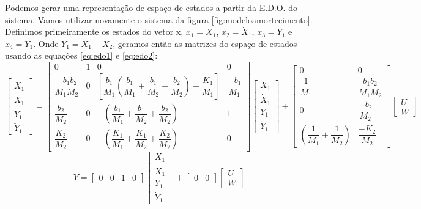 Podemos gerar uma representação de espaço de estados a partir da E.D.O. do sistema. Vamos utilizar novamente o sistema da figura \ref{fig:modeloamortecimento}. Definimos primeiramente os estados do vetor x, $x_1=X_1$, $x_2=\dot{X}_1$, $x_3=Y_1$ e $x_4=\dot{Y}_1$. Onde $Y_1=X_1-X_2$, geramos então as matrizes do espaço de estados usando as equações \eqref{eq:edo1} e \eqref{eq:edo2}:
\begin{equation}
\begin{bmatrix}
\dot{X}_1\\
\ddot{X}_1\\
\dot{Y}_1\\
\ddot{Y}_1
\end{bmatrix}
=
\begin{bmatrix}
0 & 1 & 0 & 0\\
\dfrac{-b_1b_2}{M_1M_2} & 0 &\left[ \dfrac {b_1} {M_1} \left( \dfrac {b_1} {M_1} + \dfrac{b_1}{M_2} +\dfrac{b_2}{M_2} \right)- \dfrac{K_1}{M_1}\right] & \dfrac{-b_1}{M_1}\\
\dfrac{b_2}{M_2} & 0 & -\left( \dfrac{b_1}{M_1}+ \dfrac{b_1}{M_2}+ \dfrac{b_2}{M_2} \right) & 1\\
\dfrac{K_2}{M_2} & 0 & -\left( \dfrac{K_1}{M_1} +\dfrac{K_1}{M_2}+ \dfrac{K_2}{M_2} \right) & 0
\end{bmatrix}
\begin{bmatrix}
X_1\\\dot{X}_1 \\Y_1 \\ \dot{Y}_1
\end{bmatrix}
+
\begin{bmatrix}
0 & 0 \\
\dfrac{1}{M_1} & \dfrac{b_1b_2}{M_1M_2}\\
0 & \dfrac{-b_2}{M_2} \\
\left( \dfrac{1}{M_1}+ \dfrac{1}{M_2} \right) & \dfrac{-K_2}{M_2}
\end{bmatrix}
\begin{bmatrix}
U\\W
\end{bmatrix}
\end{equation}
\begin{equation}
Y=
\begin{bmatrix}
0 & 0 & 1 & 0
\end{bmatrix}
\begin{bmatrix}
X_1\\\dot{X}_1\\Y_1\\\dot{Y}_1
\end{bmatrix}
+
\begin{bmatrix}
0 & 0
\end{bmatrix}
\begin{bmatrix}
U \\W
\end{bmatrix}
\end{equation}

